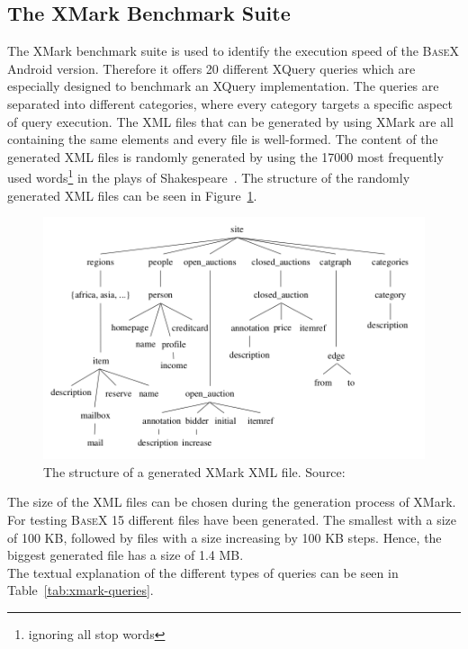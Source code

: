 \subsection{The XMark Benchmark Suite}
\label{subsec:the-xmark-benchmark-suite}
The XMark benchmark suite is used to identify the execution speed of the \textsc{BaseX} Android version.
Therefore it offers 20 different XQuery queries which are especially designed to benchmark an XQuery implementation.
The queries are separated into different categories, where every category targets a specific aspect of query execution.
The XML files that can be generated by using XMark are all containing the same elements and every file is well-formed.
The content of the generated XML files is randomly generated by using the 17000 most frequently used words\footnote{ignoring all stop words} in the plays of Shakespeare~\cite{schmidtxmark}.
The structure of the randomly generated XML files can be seen in Figure~\ref{fig:xmark-file-structure}.
\begin{figure}[htpb]
\begin{center}
\includegraphics[scale=0.42]{images/xmark-file-elements.png} 
\caption{The structure of a generated XMark XML file. Source:\cite{schmidtxmark}}
\label{fig:xmark-file-structure}
\end{center}
\end{figure}
\newpage
The size of the XML files can be chosen during the generation process of XMark.
For testing \textsc{BaseX} 15 different files have been generated.
The smallest with a size of 100 KB, followed by files with a size increasing by 100 KB steps.
Hence, the biggest generated file has a size of 1.4 MB.\\
The textual explanation of the different types of queries can be seen in Table~\ref{tab:xmark-queries}.
